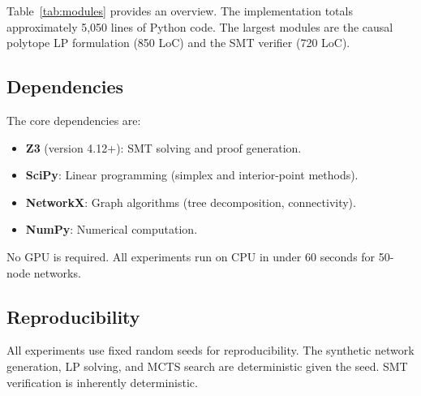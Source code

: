 \documentclass[11pt,a4paper]{article}
\begin{document}
Table~\ref{tab:modules} provides an overview. The implementation totals approximately 5,050 lines of Python code. The largest modules are the causal polytope LP formulation (850 LoC) and the SMT verifier (720 LoC).

\subsection{Dependencies}

The core dependencies are:
\begin{itemize}[nosep]
\item \textbf{Z3} (version 4.12+): SMT solving and proof generation.
\item \textbf{SciPy}: Linear programming (simplex and interior-point methods).
\item \textbf{NetworkX}: Graph algorithms (tree decomposition, connectivity).
\item \textbf{NumPy}: Numerical computation.
\end{itemize}

No GPU is required. All experiments run on CPU in under 60 seconds for 50-node networks.

\subsection{Reproducibility}

All experiments use fixed random seeds for reproducibility. The synthetic network generation, LP solving, and MCTS search are deterministic given the seed. SMT verification is inherently deterministic.



\end{document}
